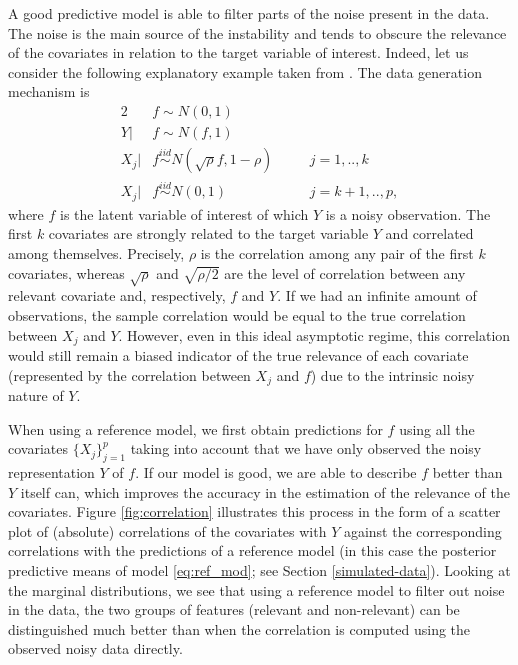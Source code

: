 \documentclass[american,]{article}
\theoremstyle{definition}
\begin{document}
A good predictive model is able to filter parts of the noise present in the data. The noise is the main source of the instability and tends to obscure the relevance of the covariates in relation to the target variable of interest. Indeed, let us consider the following explanatory example taken from \cite{paper:projpred}. The data generation mechanism is
\begin{alignat}{2} \label{eq:simulated_data}
     &f\sim N(0,1) && \nonumber \\ 
     Y|&f\sim N(f,1) && \\
     X_{j}|&f \overset{iid}{\sim} N(\sqrt{\rho}f,1-\rho) \quad &&j=1,..,k \nonumber \\
     X_{j}|&f \overset{iid}{\sim} N(0,1) &&j=k+1,..,p \nonumber,
\end{alignat}
where $f$ is the latent variable of interest of which $Y$ is a noisy observation. The first $k$ covariates are strongly related to the target variable $Y$ and correlated among themselves. Precisely, $\rho$ is the correlation among any pair of the first $k$ covariates, whereas $\sqrt{\rho}$ and $\sqrt{\rho/2}$ are the level of correlation between any relevant covariate and, respectively, $f$ and $Y$. If we had an infinite amount of observations, the sample correlation would be equal to the true correlation between $X_j$ and $Y$. However, even in this ideal asymptotic regime, this  correlation would still remain a biased indicator of the true relevance of each covariate (represented by the correlation between $X_j$ and $f$) due to the intrinsic noisy nature of $Y$.

When using a reference model, we first obtain predictions for $f$ using all the covariates $\{X_{j}\}_{j=1}^{p}$ taking into account that we have only observed the noisy representation $Y$ of $f$. If our model is good, we are able to describe $f$ better than $Y$ itself can, which improves the accuracy in the estimation of the relevance of the covariates.  Figure \ref{fig:correlation} illustrates this process in the form of a scatter plot of (absolute) correlations of the covariates with $Y$ against the corresponding correlations with the predictions of a reference model (in this case the posterior predictive means of model \eqref{eq:ref_mod}; see Section \ref{simulated-data}). Looking at the marginal distributions, we see that using a reference model to filter out noise in the data, the two groups of features (relevant and non-relevant) can be distinguished much better than when the correlation is computed using the observed noisy data directly. 
\end{document}
